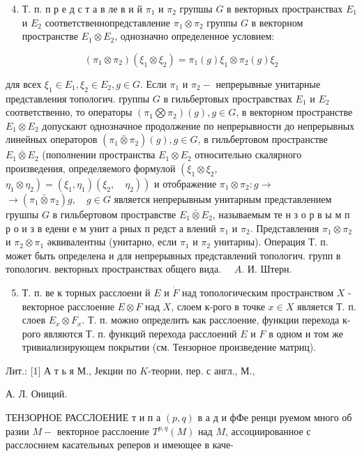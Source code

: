 \documentclass[10pt]{article}
\begin{document}
\begin{enumerate}

  \setcounter{enumi}{3}

  \item Т. п. п р е д с т а в ле в и й $\pi_{1}$ и $\pi_{2}$ групшы $G$ в векторных пространствах $E_{1}$ и $E_{2}$ соответственнопредставление $\pi_{1} \otimes \pi_{2}$ группы $G$ в векторном пространстве $E_{1} \otimes E_{2}$, однозначно определенное условием:

\end{enumerate}



\[

\left(\pi_{1} \otimes \pi_{2}\right)\left(\xi_{1} \otimes \xi_{2}\right)=\pi_{1}(g) \xi_{1} \otimes \pi_{2}(g) \xi_{2}

\]



для всех $\xi_{1} \in E_{1}, \xi_{2} \in E_{2}, g \in G$. Если $\pi_{1}$ и $\pi_{2}-$ непрерывные унитарные представления топологич. группы $G$ в гильбертовых простравствах $E_{1}$ и $E_{2}$ соответственно, то операторы $\left(\pi_{1} \bigotimes \pi_{2}\right)(g), g \in G$, в векторном пространстве $E_{1} \otimes E_{2}$ допускают однозначное продолжение по непрерывности до непрерывных линейных операторов $\left(\pi_{1} \bar{\otimes} \pi_{2}\right)(g), g \in G$, в гильбертовом пространстве $E_{1} \bar{\otimes} E_{2}$ (пополнении пространства $E_{1} \otimes E_{2}$ относительно скалярного произведения, определяемого формулой $\left(\xi_{1} \otimes \xi_{2}\right.$, $\left.\left.\eta_{1} \otimes \eta_{2}\right)=\left(\xi_{1}, \eta_{1}\right)\left(\xi_{2}, \quad \eta_{2}\right)\right)$ и отображение $\pi_{1} \otimes \pi_{2}: g \rightarrow$ $\rightarrow\left(\pi_{1} \bar{\otimes} \pi_{2}\right) g, \quad g \in G$ является непрерывным унитарным представлением грушпы $G$ в гильбертовом простравстве $E_{1} \bar{\otimes} E_{2}$, называемым те н з о р в ы м п р о и з в едени е м унит а рных п редст а влений $\pi_{1}$ и $\pi_{2}$. Представления $\pi_{1} \otimes \pi_{2}$ и $\pi_{2} \otimes \pi_{1}$ әквивалентны (унитарно, если $\pi_{1}$ и $\pi_{2}$ унитарны). Операция Т. п. может быть определена и для непрерывных представлений топологич. групп в топологич. векторных пространствах общего вида. $\quad A$. И. Штерн.



\begin{enumerate}

  \setcounter{enumi}{4}

  \item Т. п. ве к торных расслоени й $E$ и $\dot{F}$ над топологическим пространством $X$ - векторное расслоение $E \otimes F$ над $X$, слоем к-рого в точке $x \in X$ является Т. п. слоев $E_{x} \otimes F_{x}$. Т. п. можно определить как расслоение, функции перехода к-рого являются Т. п. функций перехода расслоений $E$ и $F$ в одном и том же тривиализирующем покрытии (см. Тензорное произведение матриц).

\end{enumerate}



Лит.: [1] А т ь я М., Јекции по $K$-теории, пер. с англ., М.,

А. Л. Ониций.



ТЕНЗОРНОЕ РАССЛОЕНИЕ т и п а $(p, q)$ в а д и фФе ренци руемом много об разии $M-$ векторное расслоение $T^{p, q}(M)$ над $M$, ассоциированное с расслоснием касательных реперов и имеющее в каче-
\end{document}
